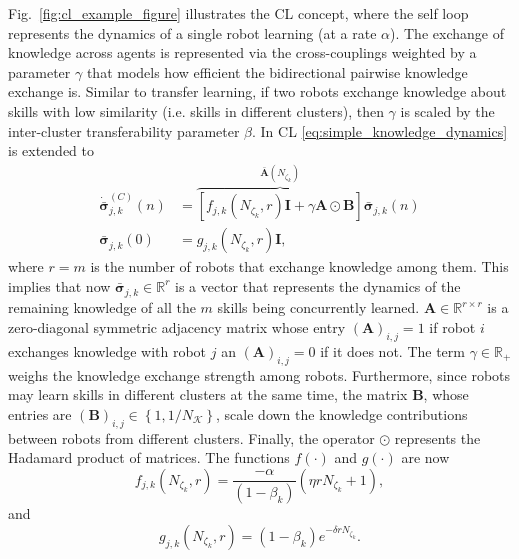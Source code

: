 Fig.~\ref{fig:cl_example_figure} illustrates the CL concept, where the self loop represents the dynamics of a single robot learning (at a rate $\alpha$). The exchange of knowledge across agents is represented via the cross-couplings weighted by a parameter $\gamma$ that models how efficient the bidirectional pairwise knowledge exchange is. Similar to transfer learning, if two robots exchange knowledge about skills with low similarity (i.e. skills in different clusters), then $\gamma$ is scaled by the inter-cluster transferability  parameter $\beta$. In CL \eqref{eq:simple_knowledge_dynamics} is extended to 
\begin{subequations}\label{eq:collective_knowledge_dynamics}
	\begin{alignat}{2}
		\dot{\bar{\bm{\sigma}}}^{(C)}_{j,k}\left(n\right) &= \overbrace{\left[  f_{j,k}\left(N_{\zeta_k},r\right) \bm{I} + \gamma \bm{A} \odot \bm{B}  \right]}^{\bar{\bm{A}}\left(N_{\zeta_k}\right)} \bar{\bm{\sigma}}_{j,k}\left(n\right)\\
		\bar{\bm{\sigma}}^{}_{j,k}(0) &= g_{j,k}\left( N_{\zeta_k}, r\right) \bm{I},
	\end{alignat}
\end{subequations}
where $r=m$ is the number of robots that exchange knowledge among them. This implies that now $\bar{\bm{\sigma}}^{}_{j,k} \in \mathbb{R}^r$ is a vector that represents the dynamics of the remaining knowledge of all the $m$ skills being concurrently learned. $\bm{A} \in \mathbb{R}^{r \times r}$ is a zero-diagonal symmetric adjacency matrix whose entry $(\bm{A})_{i,j} = 1$ if robot $i$ exchanges knowledge with robot $j$ an $(\bm{A})_{i,j} = 0$ if it does not. The term $\gamma \in \mathbb{R}_+ $ weighs the knowledge exchange strength among robots. Furthermore, since robots may learn skills in different clusters at the same time, the matrix $\bm{B}$, whose entries are $\left(\bm{B}\right)_{i,j} \in \left \lbrace 1, 1/N_\mathcal{K} \right \rbrace$, scale down the knowledge contributions between robots from different clusters. Finally, the operator $\odot$ represents the Hadamard product of matrices. The functions $ f(\cdot)$ and $g(\cdot)$ are now
\begin{equation}\label{eq:f_function_collective}
	f_{j,k}\left(N_{\zeta_k},r\right) = \frac{-\alpha}{(1 - \beta_k)}\left( \eta r N_{\zeta_k} + 1 \right),
\end{equation}
and
\begin{equation}\label{eq:g_function_collective}
	g_{j,k}\left(N_{\zeta_k},r\right) = (1-\beta_k) e^{-\delta r N_{\zeta_k}}.
\end{equation}

